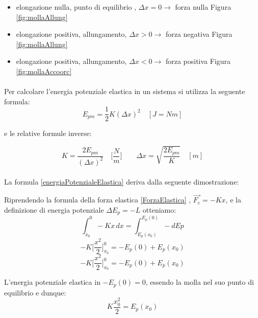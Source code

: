 \begin{itemize}
    \item elongazione nulla, punto di equilibrio , $\Delta x = 0 \rightarrow$ forza nulla \hfill Figura \ref{fig:mollaAllung}
    \item elongazione positiva, allungamento, $\Delta x > 0 \rightarrow$ forza negativa \hfill Figura \ref{fig:mollaAllung}
    \item elongazione positiva, allungamento, $\Delta x < 0 \rightarrow$ forza positiva \hfill Figura \ref{fig:mollaAccoorc}
\end{itemize}

\paragraph{}
Per calcolare l'energia potenziale elastica in un sistema si utilizza la seguente formula:
\begin{equation}
    E_{pm} = \frac{1}{2}K(\Delta x)^2 \quad[J = Nm]
    \label{energiaPotenzialeElastica}
\end{equation}

e le relative formule inverse:

\begin{equation}
   K = \frac{2E_{pm}}{(\Delta x)^2}\quad\biggl[\frac{N}{m}\biggl] \qquad \Delta x = \sqrt{\frac{2E_{pm}}{K}}\quad[m]
\end{equation}

\paragraph{}
La formula \ref{energiaPotenzialeElastica} deriva dalla seguente dimostrazione:

Riprendendo la formula della forza elastica \ref{ForzaElastica} , $\vec{F_e} = -Kx $, e la definizione di energia potenziale $\Delta E_p = -L$ otteniamo:
\begin{equation*}
    \int_{x_0}^{0}-Kx\,dx = \int_{E_p(x_0)}^{E_p(0)} -dEp
\end{equation*}
\begin{equation*}
    -K\biggl[\frac{x^2}{2}\biggl]_{x_0}^{0} = -E_p(0) + E_p(x_0)
\end{equation*}
\begin{equation*}
    -K\biggl[\frac{x^2}{2}\biggl]_{x_0}^{0} = -E_p(0) + E_p(x_0)
\end{equation*}

L'energia potenziale elastica in $-E_p(0) = 0$, essendo la molla nel suo punto di equilibrio e dunque:
\begin{equation}
    K\frac{x_0^2}{2} = E_p(x_0)
\end{equation}


